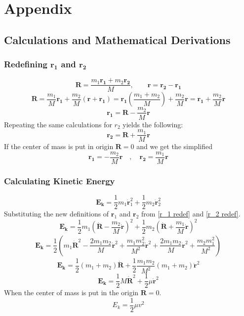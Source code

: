 \documentclass[reprint,english,notitlepage]{revtex4-2}
\begin{document}
\section{Appendix}

	\subsection{Calculations and Mathematical Derivations}
		\subsubsection{Redefining $ \mathbf{r_1} $ and $ \mathbf{r_2} $}\label{r1r2 calc}
			\[
			\mathbf{R} = \frac{m_1 \mathbf{r_1} + m_2 \mathbf{r_2}}{M}, \qquad \mathbf{r} = \mathbf{r_2} - \mathbf{r_1}
			\]
			\[
			\mathbf{R} = \frac{m_1}{M}\mathbf{r_1} + \frac{m_2}{M} \left( \mathbf{r} + \mathbf{r_1} \right) = \mathbf{r_1} \left( \frac{m_1 + m_2}{M} \right) + \frac{m_2}{M} \mathbf{r} = \mathbf{r_1} + \frac{m_2}{M} \mathbf{r}
			\]
			\[
			\mathbf{r_1} = \mathbf{R} - \frac{m_2}{M}\mathbf{r}
			\]
			Repeating the same calculations for $ r_2 $ yields the following: 
			\[
			\mathbf{r_2} = \mathbf{R} + \frac{m_1}{M} \mathbf{r}
			\]
			If the center of mass is put in origin $ \mathbf{R} = 0 $ and we get the simplified
			\[
			\mathbf{r_1} = - \frac{m_2}{M}\mathbf{r} \quad , \quad \mathbf{r_2} = \frac{m_1}{M}\mathbf{r}
			\]

		\subsubsection{Calculating Kinetic Energy}\label{E_k calc}
			\[
				\mathbf{E_k} = \frac{1}{2}m_1 \mathbf{\dot{r}}_{1}^{2} + \frac{1}{2}m_2 \mathbf{\dot{r}}_{2}^{2}
			\]
			Substituting the new definitions of $ \mathbf{r}_1 $ and $ \mathbf{r}_2 $ from \ref{r_1 redef} and  \ref{r_2 redef}.
			\[
			\mathbf{E_k} = \frac{1}{2} m_1 \left(\mathbf{\dot{R}} - \frac{m_2}{M}\mathbf{\dot{r}}\right)_{}^{2} + \frac{1}{2} m_2 \left(\mathbf{\dot{R}} + \frac{m_1}{M} \mathbf{\dot{r}}\right)_{}^{2}
			\]
			\[
			\mathbf{E_k} = \frac{1}{2} \left(m_1 \mathbf{\dot{R}}^{2} - \frac{2m_1 m_2}{M}\mathbf{\dot{r}}^{2} + \frac{m_1m_2^{2}}{M^{2}}\mathbf{\dot{r}}^{2} + \frac{2m_1m_2}{M}\mathbf{\dot{r}}^{2} + \frac{m_2m_1^{2}}{M^{2}}\right)_{}^{}
			\]
			\[
			\mathbf{E_k} = \frac{1}{2}\left( m_1 + m_2 \right) \mathbf{\dot{R}} + \frac{1}{2} \frac{m_1m_2}{M^{2}} \left( m_1+ m_2  \right) \mathbf{\dot{r}}^{2}
			\]
			\[
			\mathbf{E_k} = \frac{1}{2} M \mathbf{\dot{R}}^{2} + \frac{1}{2} μ \mathbf{\dot{r}}^{2}
			\]
			When the center of mass is put in the origin $ \mathbf{R} = 0 $.
			\[
			E_k = \frac{1}{2} \mu v^{2}
			\]
\end{document}

